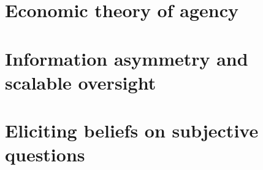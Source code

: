 \documentclass[11pt,a4paper,oneside]{book}
\begin{document}
\frontmatter


\withallchaptermacros{%
  \tableofcontents
  \listoffigures
  \listoftables
}





\mainmatter


\part{Economic theory of agency}\label{part:agency}

\part{Information asymmetry and scalable oversight}\label{part:oversight}

\part{Eliciting beliefs on subjective questions}\label{part:subjective}

\backmatter


\end{document}
